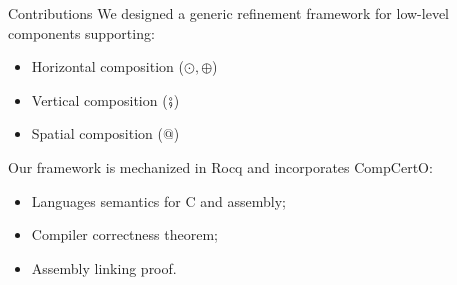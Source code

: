 \documentclass[aspectratio=1610,mathserif]{beamer}
\newcommand{\kw}[1]{\ensuremath{ \mathrm{#1} }}
\begin{document}
\begin{frame}{Contributions} %
  We designed a generic refinement framework for low-level components supporting:
  \begin{itemize}
    \item Horizontal composition ($\odot, \oplus$) %
    \item Vertical composition ($\fatsemi$) %
    \item Spatial composition ($\mathbin@$) %
  \end{itemize}

%

  \pause\vfill
  Our framework is mechanized in Rocq and incorporates CompCertO:
  \begin{itemize}
    \item Languages semantics for C and assembly;
    \item Compiler correctness theorem;
    \item Assembly linking proof.
  \end{itemize}

%
\end{frame}
\end{document}
